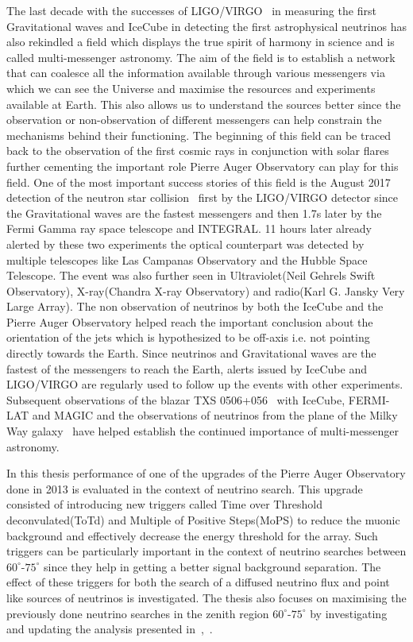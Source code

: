 The last decade with the successes of LIGO/VIRGO~\cite{PhysRevLett.116.061102} in measuring the first Gravitational waves and IceCube in detecting the first astrophysical neutrinos has also rekindled a field which displays the true spirit of harmony in science and is called multi-messenger astronomy. The aim of the field is to establish a network that can coalesce all the information available through various messengers via which we can see the Universe and maximise the resources and experiments available at Earth. This also allows us to understand the sources better since the observation or non-observation of different messengers can help constrain the mechanisms behind their functioning. The beginning of this field can be traced back to the observation of the first cosmic rays in conjunction with solar flares further cementing the important role Pierre Auger Observatory can play for this field. One of the most important success stories of this field is the August 2017 detection of the neutron star collision~\cite{Abbott_2017} first by the LIGO/VIRGO detector since the Gravitational waves are the fastest messengers and then 1.7s later by the Fermi Gamma ray space telescope and INTEGRAL. 11 hours later already alerted by these two experiments the optical counterpart was detected by multiple telescopes like Las Campanas Observatory and the Hubble Space Telescope. The event was also further seen in Ultraviolet(Neil Gehrels Swift Observatory), X-ray(Chandra X-ray Observatory) and radio(Karl G. Jansky Very Large Array). The non observation of neutrinos by both the IceCube and the Pierre Auger Observatory helped reach the important conclusion about the orientation of the jets which is hypothesized to be off-axis i.e. not pointing directly towards the Earth. Since neutrinos and Gravitational waves are the fastest of the messengers to reach the Earth, alerts issued by IceCube and LIGO/VIRGO are regularly used to follow up the events with other experiments. Subsequent observations of the blazar TXS 0506+056~\cite{TXS_Multi_2018} with IceCube, FERMI-LAT and MAGIC and the observations of neutrinos from the plane of the Milky Way galaxy~\cite{Galactic_plane_nu_2023} have helped establish the continued importance of multi-messenger astronomy.

In this thesis performance of one of the upgrades of the Pierre Auger Observatory done in 2013 is evaluated in the context of neutrino search. This upgrade consisted of introducing new triggers called Time over Threshold deconvulated(ToTd) and Multiple of Positive Steps(MoPS) to reduce the muonic background and effectively decrease the energy threshold for the array. Such triggers can be particularly important in the context of neutrino searches between $60^\circ$-$75^\circ$ since they help in getting a better signal background separation. The effect of these triggers for both the search of a diffused neutrino flux and point like sources of neutrinos is investigated. The thesis also focuses on maximising the previously done neutrino searches in the zenith region $60^\circ$-$75^\circ$ by investigating and updating the analysis presented in~\cite{Aab_2019_diffuse},~\cite{gap_note_2013}.

